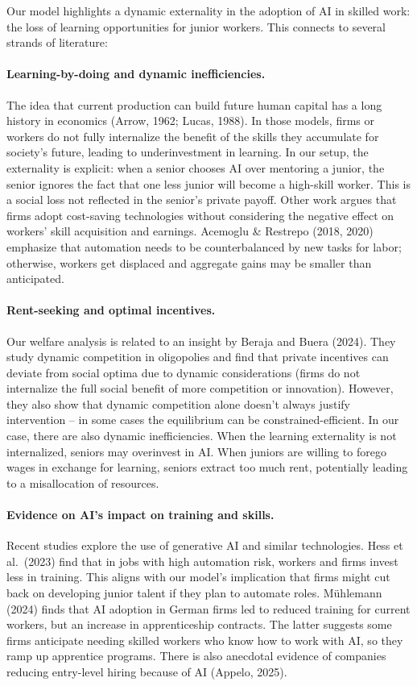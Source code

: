 \documentclass[12pt]{article}
\begin{document}
\bigskip

Our model highlights a {dynamic externality} in the adoption of
AI in skilled work: the loss of learning opportunities for junior
workers. This connects to several strands of literature:

\paragraph{Learning-by-doing and dynamic inefficiencies.} The idea that
current production can build future human capital has a long history
in economics (Arrow, 1962; Lucas, 1988). In those models, firms or
workers do not fully internalize the benefit of the skills they
accumulate for society's future, leading to underinvestment in
learning. In our setup, the externality is explicit: when a senior
chooses AI over mentoring a junior, the senior ignores the fact that
one less junior will become a high-skill worker. This is a social loss
not reflected in the senior's private payoff. Other work argues that firms adopt cost-saving
technologies without considering the negative effect on workers' skill
acquisition and earnings. Acemoglu \& Restrepo (2018, 2020) emphasize
that automation needs to be counterbalanced by new tasks for labor;
otherwise, workers get displaced and aggregate gains may be smaller
than anticipated. 

\paragraph{Rent-seeking and optimal incentives.} Our welfare analysis is related to an
insight by Beraja and Buera (2024). They study dynamic competition
in oligopolies and find that private incentives can deviate from
social optima due to dynamic considerations (firms do not internalize
the full social benefit of more competition or innovation). However,
they also show that {dynamic competition alone doesn't always
justify intervention} -- in some cases the equilibrium can be
constrained-efficient. In our case, there are also dynamic inefficiencies. When the learning externality is not internalized, seniors may overinvest in AI. When juniors are willing to forego wages in exchange for learning, seniors extract too much rent, potentially leading to a misallocation of resources. 

\paragraph{Evidence on AI's impact on training and skills.} Recent studies explore the use of generative AI and similar technologies.
Hess et al.~(2023) find that in jobs with high
automation risk, {workers and firms invest less in training}.
This aligns with our model's implication that firms might cut back
on developing junior talent if they plan to automate roles.
Mühlemann (2024) finds that {AI adoption in German firms led
to reduced training for current workers, but an increase in
apprenticeship contracts}. The latter suggests some firms anticipate
needing skilled workers who know how to work with AI, so they ramp
up apprentice programs. There is also anecdotal evidence of companies {reducing
entry-level hiring} because of AI (Appelo, 2025).
\end{document}
